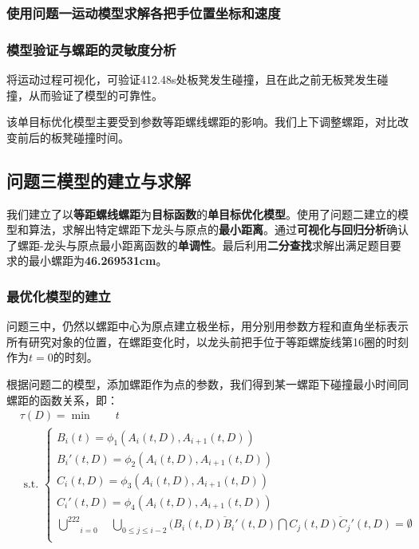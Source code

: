 \documentclass[a4paper]{article}
\begin{document}
        \subsubsection{使用问题一运动模型求解各把手位置坐标和速度}
        \subsubsection{模型验证与螺距的灵敏度分析}
        将运动过程可视化，可验证412.48s处板凳发生碰撞，且在此之前无板凳发生碰撞，从而验证了模型的可靠性。

        该单目标优化模型主要受到参数等距螺线螺距的影响。我们上下调整螺距，对比改变前后的板凳碰撞时间。
	\subsection{问题三模型的建立与求解}
 我们建立了以\textbf{等距螺线螺距}为\textbf{目标函数}的\textbf{单目标优化模型}。使用了问题二建立的模型和算法，求解出特定螺距下龙头与原点的\textbf{最小距离}。通过\textbf{可视化与回归分析}确认了螺距-龙头与原点最小距离函数的\textbf{单调性}。最后利用\textbf{二分查找}求解出满足题目要求的最小螺距为\textbf{46.269531cm}。
	\subsubsection{最优化模型的建立}
 问题三中，仍然以螺距中心为原点建立极坐标，用分别用参数方程和直角坐标表示所有研究对象的位置，在螺距变化时，以龙头前把手位于等距螺旋线第16圈的时刻作为$t = 0$的时刻。

 根据问题二的模型，添加螺距作为点的参数，我们得到某一螺距下碰撞最小时间同螺距的函数关系，即：
 		\begin{equation}
   \begin{aligned}
				& \tau(D) = \min \quad \quad t \\
				& \text { s.t. }\left\{\begin{array}{l}
                        B_i(t) = \phi_1(A_i(t, D), A_{i + 1}(t, D))\\
                        B_{i}'(t, D) = \phi_2(A_i(t, D), A_{i + 1}(t, D))\\
                        C_i(t, D) = \phi_3(A_i(t, D), A_{i + 1}(t, D))\\
                        C_{i}'(t, D) = \phi_4(A_i(t, D), A_{i + 1}(t, D))\\
               \underset{i=0}{\overset{222}{\bigcup}}\quad \underset{0\leq j \leq i - 2}{\bigcup}(\overline{B_i(t, D)B_{i}'(t, D)}\bigcap \overline{C_j(t,D)C_{j}'(t, D)} = \emptyset

  \\

				\end{array}\right.
    \end{aligned}
		\end{equation}
\end{document}
